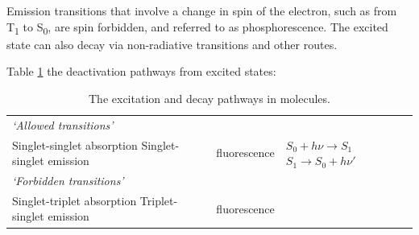 \documentclass[
]{book}
\begin{document}
Emission transitions that involve a change in spin of the electron, such as from T\textsubscript{1} to S\textsubscript{0}, are spin forbidden, and referred to as phosphorescence. The excited state can also decay via non-radiative transitions and other routes.

Table \ref{tab:phototrans} the deactivation pathways from excited states:

\begin{longtable}[]{@{}lll@{}}
\caption{\label{tab:phototrans} The excitation and decay pathways in molecules.}\tabularnewline
\toprule
\endhead
\begin{minipage}[t]{0.39\columnwidth}\raggedright
\emph{`Allowed transitions'}\strut
\end{minipage} & \begin{minipage}[t]{0.26\columnwidth}\raggedright
\strut
\end{minipage} & \begin{minipage}[t]{0.26\columnwidth}\raggedright
\strut
\end{minipage}\tabularnewline
\begin{minipage}[t]{0.39\columnwidth}\raggedright
Singlet-singlet absorption Singlet-singlet emission\strut
\end{minipage} & \begin{minipage}[t]{0.26\columnwidth}\raggedright
fluorescence\strut
\end{minipage} & \begin{minipage}[t]{0.26\columnwidth}\raggedright
\(S_0 + h \nu \longrightarrow S_1\) \(S_1 \longrightarrow S_0 + h \nu '\)\strut
\end{minipage}\tabularnewline
\begin{minipage}[t]{0.39\columnwidth}\raggedright
\emph{`Forbidden transitions'}\strut
\end{minipage} & \begin{minipage}[t]{0.26\columnwidth}\raggedright
\strut
\end{minipage} & \begin{minipage}[t]{0.26\columnwidth}\raggedright
\strut
\end{minipage}\tabularnewline
\begin{minipage}[t]{0.39\columnwidth}\raggedright
Singlet-triplet absorption Triplet-singlet emission\strut
\end{minipage} & \begin{minipage}[t]{0.26\columnwidth}\raggedright
fluorescence\strut
\end{minipage} & \begin{minipage}[t]{0.26\columnwidth}\raggedright

\end{minipage}
\end{longtable}
\end{document}
